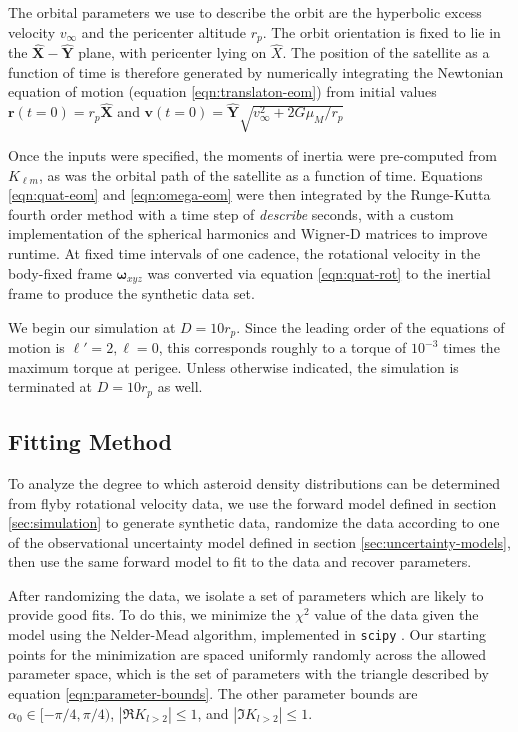 \documentclass[linenumbers]{aastex631}
\newcommand{\unit}[1]{\hat{\mathbf{#1}}}
\newcommand{\jtd}[1]{{\color{red}\textit{#1}}}
\begin{document}
The orbital parameters we use to describe the orbit are the hyperbolic excess velocity $v_\infty$ and the pericenter altitude $r_p$. The orbit orientation is fixed to lie in the $\unit X-\unit Y$ plane, with pericenter lying on $\hat X$. The position of the satellite as a function of time is therefore generated by numerically integrating the Newtonian equation of motion (equation \ref{eqn:translaton-eom}) from initial values $\mathbf r(t=0) = r_p \unit X$ and $\mathbf v(t=0)=\unit Y \sqrt{v_\infty^2 + 2G\mu_M / r_p}$

Once the inputs were specified, the moments of inertia were pre-computed from $K_{\ell m}$, as was the orbital path of the satellite as a function of time. Equations \ref{eqn:quat-eom} and \ref{eqn:omega-eom} were then integrated by the Runge-Kutta fourth order method with a time step of \jtd{describe} seconds, with a custom implementation of the spherical harmonics and Wigner-D matrices to improve runtime. At fixed time intervals of one cadence, the rotational velocity in the body-fixed frame $\mathbf\omega_{xyz}$ was converted via equation \ref{eqn:quat-rot} to the inertial frame to produce the synthetic data set.

We begin our simulation at $D = 10 r_p$. Since the leading order of the equations of motion is $\ell' = 2, \ell = 0$, this corresponds roughly to a torque of $10^{-3}$ times the maximum torque at perigee. Unless otherwise indicated, the simulation is terminated at $D=10 r_p$ as well.


\subsection{Fitting Method}
\label{sec:fitting-method}
To analyze the degree to which asteroid density distributions can be determined from flyby rotational velocity data, we use the forward model defined in section \ref{sec:simulation} to generate synthetic data, randomize the data according to one of the observational uncertainty model defined in section \ref{sec:uncertainty-models}, then use the same forward model to fit to the data and recover parameters.

After randomizing the data, we isolate a set of parameters which are likely to provide good fits. To do this, we minimize the $\chi^2$ value of the data given the model using the Nelder-Mead algorithm, implemented in \texttt{scipy} \cite{NelderMead}. Our starting points for the minimization are spaced uniformly randomly across the allowed parameter space, which is the set of parameters with the triangle described by equation \ref{eqn:parameter-bounds}. The other parameter bounds are $\alpha_0 \in [-\pi/4, \pi/4)$, $|\Re K_{l>2}| \leq 1$, and $|\Im K_{l>2}| \leq  1$.
\end{document}
